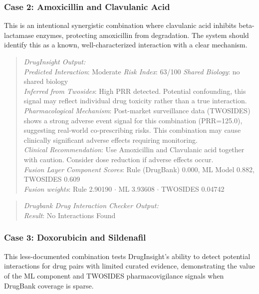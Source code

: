 \documentclass[conference]{IEEEtran}
\begin{document}
\subsubsection{\textbf{Case 2: Amoxicillin and Clavulanic Acid}}
This is an intentional synergistic combination where clavulanic acid inhibits beta-lactamase enzymes, protecting amoxicillin from degradation. The system should identify this as a known, well-characterized interaction with a clear mechanism.

\begin{quote}
\textit{DrugInsight Output:}\\
\textit{Predicted Interaction}: Moderate \newline\quad \textit{Risk Index}: 63/100\newline
\quad \textit{Shared Biology}: no shared biology\\ \newline
\textit{Inferred from Twosides}: High PRR detected. Potential confounding, this signal may reflect individual drug toxicity rather than a true interaction. \\ \newline
\textit{Pharmacological Mechanism}: Post-market surveillance data (TWOSIDES) shows a strong adverse event signal for this combination (PRR=125.0), suggesting real-world co-prescribing risks. This combination may cause clinically significant adverse effects requiring monitoring. \\ \newline
\textit{Clinical Recommendation}: Use Amoxicillin and Clavulanic acid together with caution. Consider dose reduction if adverse effects occur. \\ \newline
\textit{Fusion Layer Component Scores}: Rule (DrugBank) 0.000, ML Model 0.882, TWOSIDES 0.609\\ \newline
\textit{Fusion weights}: Rule 2.90190 $\cdot$ ML 3.93608 $\cdot$ TWOSIDES 0.04742
\end{quote}

\begin{quote}
\textit{Drugbank Drug Interaction Checker Output:}\\
\quad \textit{Result}: No Interactions Found \cite{drugbankchecker}\\
\end{quote}

\subsubsection{\textbf{Case 3: Doxorubicin and Sildenafil}}
This less-documented combination tests DrugInsight's ability to detect potential interactions for drug pairs with limited curated evidence, demonstrating the value of the ML component and TWOSIDES pharmacovigilance signals when DrugBank coverage is sparse.
\end{document}
